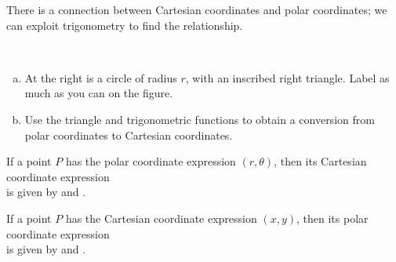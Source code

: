 \documentclass[notes]{subfiles}
\begin{document}
		There is a connection between Cartesian coordinates and polar coordinates; we can exploit trigonometry to find the relationship.\\[2pt]
			\begin{minipage}{3in}			
			\begin{ex}$ $
				\begin{enumerate}[(a)]
				\setlength\itemsep{10pt}
					\item At the right is a circle of radius $r$, with an inscribed right triangle.  Label as much as you can on the figure.
					\item Use the triangle and trigonometric functions to obtain a conversion from polar coordinates to Cartesian coordinates.
				\end{enumerate}				
			\end{ex}
			\end{minipage}
			\begin{minipage}{4in}
				\begin{center}
				\end{center}
			\end{minipage}
				\newpage
		
		\begin{rmk}
			If a point $P$ has the polar coordinate expression $(r,\theta)$, then its Cartesian coordinate expression\\[20pt] is given by \blank{2} and . 
		\end{rmk}
		
		\begin{rmk}
			If a point $P$ has the Cartesian coordinate expression $(x,y)$, then its polar coordinate expression\\[20pt] is given by  and .
		\end{rmk}
		
\end{document}
